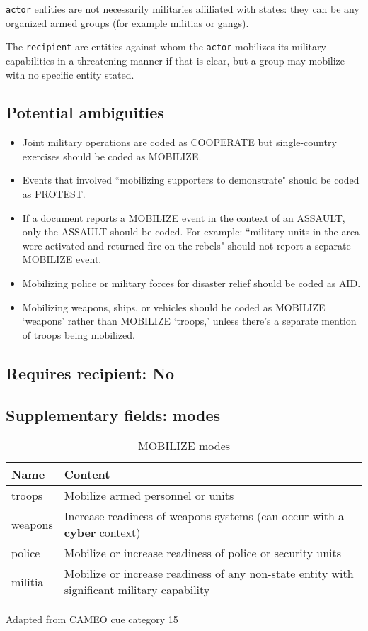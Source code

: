 \documentclass[11pt]{report}
\newcommand{\plcat}[1]{\textsf{#1}}
\newcommand{\plcon}[1]{\textbf{#1}}
\newcommand{\txt}[1]{\texttt{#1}}
\begin{document}
\txt{actor} entities  are not necessarily militaries affiliated with states: they can be any organized armed groups (for example militias or gangs).

The \txt{recipient} are entities against whom the \txt{actor} mobilizes its military capabilities in a threatening manner if that is clear, but a group may mobilize with no specific entity stated.

\subsection{Potential ambiguities}

\begin{itemize}
\item Joint military operations are coded as \plcat{COOPERATE} but single-country exercises should be coded as \plcat{MOBILIZE}.
\item Events that involved ``mobilizing supporters to demonstrate" should be coded as \plcat{PROTEST}.
\item If a document reports a \plcat{MOBILIZE} event in the context of an \plcat{ASSAULT}, only the \plcat{ASSAULT} should be coded. For example: ``military units in the area were activated and returned fire on the rebels" should not report a separate \plcat{MOBILIZE} event.
\item Mobilizing police or military forces for disaster relief should be coded as \plcat{AID}.
\item Mobilizing weapons, ships, or vehicles should be coded as \plcat{MOBILIZE} `weapons' rather than \plcat{MOBILIZE} `troops,' unless there's a separate mention of troops being mobilized.
\end{itemize}

\subsection{Requires recipient: No}

\subsection{Supplementary fields: modes }

\begin{table}[htp]
\caption{MOBILIZE modes}
\begin{center}
\begin{tabular}{|l|p{13cm}|}
\hline
Name & Content \\
\hline
troops & Mobilize armed personnel or units\\
weapons & Increase readiness of weapons systems (can occur with a \plcon{cyber} context) \\
police & Mobilize or increase readiness of police or security units\\
militia & Mobilize or increase readiness of any non-state entity with significant military capability\\
\hline
\end{tabular}
\end{center}
\label{tab:mobilizemode}
Adapted from CAMEO cue category 15
\end{table}
\end{document}
